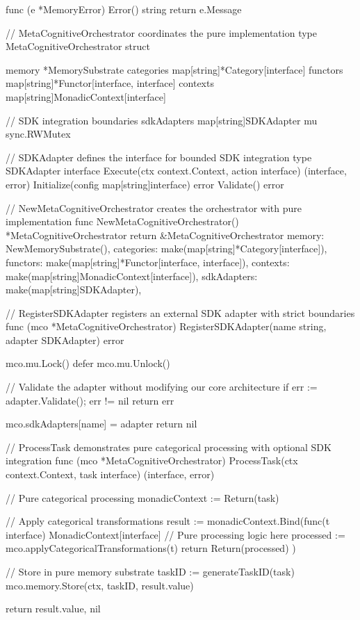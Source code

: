 func (e *MemoryError) Error() string {
    return e.Message
}

// MetaCognitiveOrchestrator coordinates the pure implementation
type MetaCognitiveOrchestrator struct {
    memory      *MemorySubstrate
    categories  map[string]*Category[interface{}]
    functors    map[string]*Functor[interface{}, interface{}]
    contexts    map[string]MonadicContext[interface{}]

    // SDK integration boundaries
    sdkAdapters map[string]SDKAdapter
    mu          sync.RWMutex
}

// SDKAdapter defines the interface for bounded SDK integration
type SDKAdapter interface {
    Execute(ctx context.Context, action interface{}) (interface{}, error)
    Initialize(config map[string]interface{}) error
    Validate() error
}

// NewMetaCognitiveOrchestrator creates the orchestrator with pure implementation
func NewMetaCognitiveOrchestrator() *MetaCognitiveOrchestrator {
    return &MetaCognitiveOrchestrator{
        memory:      NewMemorySubstrate(),
        categories:  make(map[string]*Category[interface{}]),
        functors:    make(map[string]*Functor[interface{}, interface{}]),
        contexts:    make(map[string]MonadicContext[interface{}]),
        sdkAdapters: make(map[string]SDKAdapter),
    }
}

// RegisterSDKAdapter registers an external SDK adapter with strict boundaries
func (mco *MetaCognitiveOrchestrator) RegisterSDKAdapter(name string, adapter SDKAdapter) error {
    mco.mu.Lock()
    defer mco.mu.Unlock()

    // Validate the adapter without modifying our core architecture
    if err := adapter.Validate(); err != nil {
        return err
    }

    mco.sdkAdapters[name] = adapter
    return nil
}

// ProcessTask demonstrates pure categorical processing with optional SDK integration
func (mco *MetaCognitiveOrchestrator) ProcessTask(ctx context.Context, task interface{}) (interface{}, error) {
    // Pure categorical processing
    monadicContext := Return(task)

    // Apply categorical transformations
    result := monadicContext.Bind(func(t interface{}) MonadicContext[interface{}] {
        // Pure processing logic here
        processed := mco.applyCategoricalTransformations(t)
        return Return(processed)
    })

    // Store in pure memory substrate
    taskID := generateTaskID(task)
    mco.memory.Store(ctx, taskID, result.value)

    return result.value, nil
}

